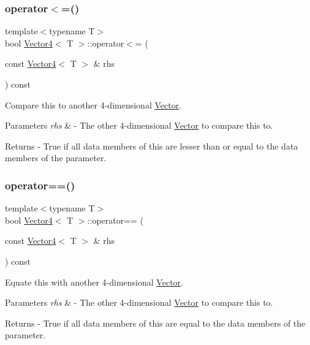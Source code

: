 \subsubsection{\texorpdfstring{operator$<$=()}{operator<=()}}
{\footnotesize\ttfamily template$<$typename T$>$ \\
bool \mbox{\hyperlink{class_vector4}{Vector4}}$<$ T $>$\+::operator$<$= (\begin{DoxyParamCaption}\item[{const \mbox{\hyperlink{class_vector4}{Vector4}}$<$ T $>$ \&}]{rhs }\end{DoxyParamCaption}) const}

Compare this to another 4-\/dimensional \mbox{\hyperlink{class_vector}{Vector}}. 
\begin{DoxyParams}{Parameters}
{\em rhs} & -\/ The other 4-\/dimensional \mbox{\hyperlink{class_vector}{Vector}} to compare this to. \\
\hline
\end{DoxyParams}
\begin{DoxyReturn}{Returns}
-\/ True if all data members of this are lesser than or equal to the data members of the parameter. 
\end{DoxyReturn}
\mbox{\label{class_vector4_ab25cd3a793ef8f07c92fae01a94e7967}} 
\subsubsection{\texorpdfstring{operator==()}{operator==()}}
{\footnotesize\ttfamily template$<$typename T$>$ \\
bool \mbox{\hyperlink{class_vector4}{Vector4}}$<$ T $>$\+::operator== (\begin{DoxyParamCaption}\item[{const \mbox{\hyperlink{class_vector4}{Vector4}}$<$ T $>$ \&}]{rhs }\end{DoxyParamCaption}) const}

Equate this with another 4-\/dimensional \mbox{\hyperlink{class_vector}{Vector}}. 
\begin{DoxyParams}{Parameters}
{\em rhs} & -\/ The other 4-\/dimensional \mbox{\hyperlink{class_vector}{Vector}} to compare this to. \\
\hline
\end{DoxyParams}
\begin{DoxyReturn}{Returns}
-\/ True if all data members of this are equal to the data members of the parameter. 
\end{DoxyReturn}
\mbox{\label{class_vector4_abb9410703aa2cd16a1eebdc8455b3684}} 
